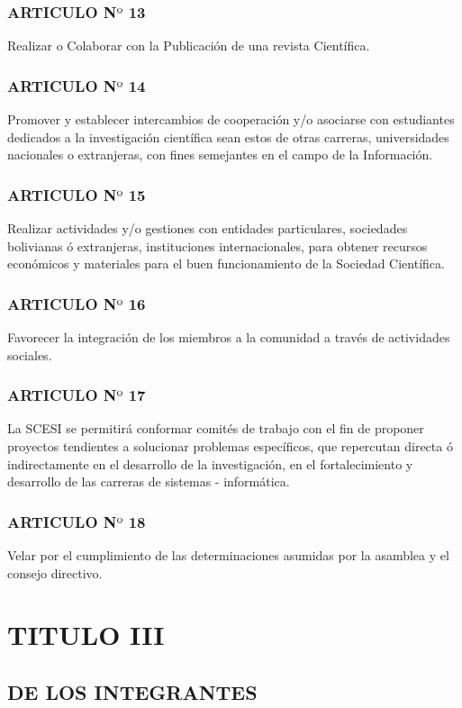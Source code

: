 \documentclass[11pt,letterpaper]{book}
\begin{document}
\subsubsection*{ARTICULO N$º$ 13}
Realizar o Colaborar con la Publicación de una revista Científica.
\subsubsection*{ARTICULO N$º$ 14}
Promover y establecer intercambios de cooperación y/o asociarse con estudiantes dedicados a la investigación científica sean estos de otras carreras, universidades nacionales o extranjeras, con fines semejantes en el campo de la Información.
\subsubsection*{ARTICULO N$º$ 15}
Realizar actividades y/o gestiones con entidades particulares, sociedades bolivianas ó extranjeras, instituciones internacionales, para obtener recursos económicos y materiales para el buen funcionamiento de la Sociedad Científica.
\subsubsection*{ARTICULO N$º$ 16}
Favorecer la integración de los miembros a la comunidad a través de actividades sociales.
\subsubsection*{ARTICULO N$º$ 17}
La SCESI se permitirá conformar comités de trabajo con el fin de proponer proyectos tendientes a solucionar problemas específicos, que repercutan directa ó indirectamente en el desarrollo de la investigación, en el fortalecimiento y desarrollo de las carreras de sistemas - informática.
\subsubsection*{ARTICULO N$º$ 18}
Velar por el cumplimiento de las determinaciones asumidas por la asamblea y el consejo directivo.
\newpage
\section*{TITULO III}
\subsection*{DE LOS INTEGRANTES}
\end{document}
